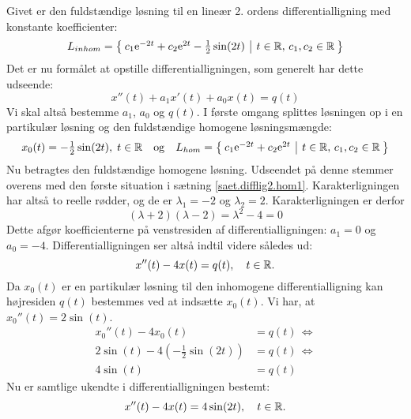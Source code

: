 \begin{example}
Givet er den fuldstændige løsning til en lineær 2. ordens differentialligning med konstante koefficienter:
\begin{equation}
L_{inhom} = \left\lbrace \hspace*{-1mm} \begin{array}{c|c} c_1 \mathrm{e}^{-2t} + c_2 \mathrm{e}^{2t} - \tfrac{1}{2}\sin(2t) & t \in \mathbb{R}, \, c_1,c_2 \in \mathbb{R} \end{array} \hspace*{-1mm} \right\rbrace
\end{equation}
Det er nu formålet at opstille differentialligningen, som generelt har dette udseende:
\begin{equation}
x''(t) + a_1x'(t) + a_0x(t) = q(t)
\end{equation}
Vi skal altså bestemme $ a_1 $, $ a_0 $ og $ q(t) $. \bs
I første omgang splittes løsningen op i en partikulær løsning og den fuldstændige homogene løsningsmængde:
\begin{equation}
x_0(t) =  - \tfrac{1}{2}\sin(2t),\; t \in \mathbb{R} \quad \mathrm{og} \quad L_{hom} = \left\lbrace \hspace*{-1mm} \begin{array}{c|c} c_1 \mathrm{e}^{-2t} + c_2 \mathrm{e}^{2t} & t \in \mathbb{R}, \, c_1,c_2 \in \mathbb{R} \end{array} \hspace*{-1mm} \right\rbrace
\end{equation}
Nu betragtes den fuldstændige homogene løsning. Udseendet på denne stemmer overens med den første situation i sætning \ref{saet.difflig2.hom1}. Karakterligningen har altså to reelle rødder, og de er $ \lambda_1 = -2 $ og $ \lambda_2 = 2 $. Karakterligningen er derfor
\begin{equation}
(\lambda + 2)(\lambda - 2) = \lambda^2 - 4 = 0
\end{equation}
Dette afgør koefficienterne på venstresiden af differentialligningen: $ a_1 = 0 $ og $ a_0 = -4 $. Differentialligningen ser altså indtil videre således ud:
\begin{equation}
x''(t) -4x(t) = q(t), \quad t \in \mathbb{R}.
\end{equation}
Da $ x_0(t) $ er en partikulær løsning til den inhomogene differentialligning kan højresiden $ q(t) $ bestemmes ved at indsætte $ x_0(t) $. Vi har, at $ x_0''(t) = 2\sin(t) $.
\begin{equation}
\begin{aligned}
x_0''(t) -4x_0(t) &= q(t) \, \Leftrightarrow \\
2\sin(t) -4(- \tfrac{1}{2}\sin(2t)) &= q(t) \, \Leftrightarrow \\
4\sin(t) &= q(t)
\end{aligned}
\end{equation}
Nu er samtlige ukendte i differentialligningen bestemt:
\begin{equation}
x''(t) - 4 x(t) = 4\sin(2t), \quad t \in \mathbb{R}.
\end{equation}
\end{example}

